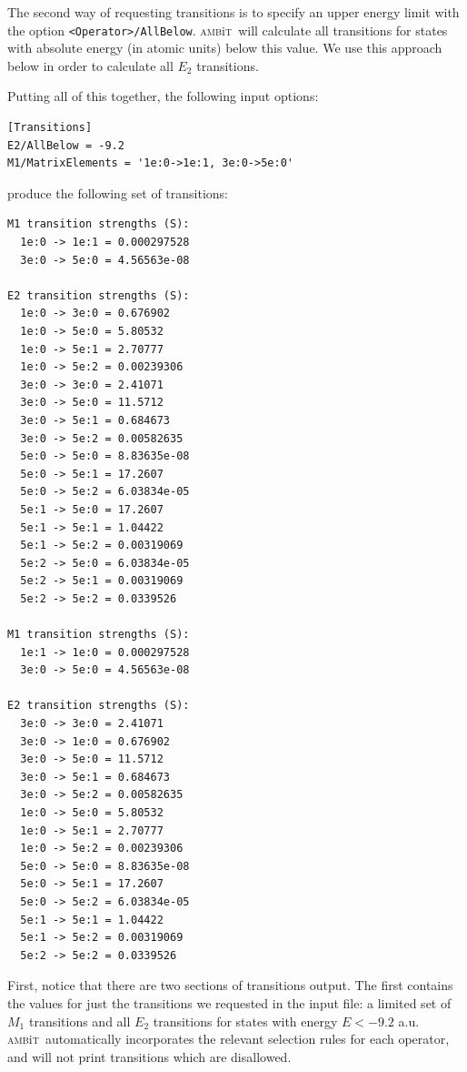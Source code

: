 \documentclass{report}
\newcommand{\ambit}{\textsc{amb}{\footnotesize i}\textsc{t}}
\begin{document}
The second way of requesting transitions is to specify an upper energy limit with the option
\texttt{<Operator>/AllBelow}. \ambit\  will calculate all transitions for states with absolute energy (in
atomic units) below this value. We use this approach below in order to calculate all $E_{2}$ 
transitions.

Putting all of this together, the following input options:

\begin{verbatim}
[Transitions]                                                                  
E2/AllBelow = -9.2                                                                
M1/MatrixElements = '1e:0->1e:1, 3e:0->5e:0'
\end{verbatim}

produce the following set of transitions:

\begin{verbatim}
M1 transition strengths (S):
  1e:0 -> 1e:1 = 0.000297528
  3e:0 -> 5e:0 = 4.56563e-08

E2 transition strengths (S):
  1e:0 -> 3e:0 = 0.676902
  1e:0 -> 5e:0 = 5.80532
  1e:0 -> 5e:1 = 2.70777
  1e:0 -> 5e:2 = 0.00239306
  3e:0 -> 3e:0 = 2.41071
  3e:0 -> 5e:0 = 11.5712
  3e:0 -> 5e:1 = 0.684673
  3e:0 -> 5e:2 = 0.00582635
  5e:0 -> 5e:0 = 8.83635e-08
  5e:0 -> 5e:1 = 17.2607
  5e:0 -> 5e:2 = 6.03834e-05
  5e:1 -> 5e:0 = 17.2607
  5e:1 -> 5e:1 = 1.04422
  5e:1 -> 5e:2 = 0.00319069
  5e:2 -> 5e:0 = 6.03834e-05
  5e:2 -> 5e:1 = 0.00319069
  5e:2 -> 5e:2 = 0.0339526

M1 transition strengths (S):
  1e:1 -> 1e:0 = 0.000297528
  3e:0 -> 5e:0 = 4.56563e-08

E2 transition strengths (S):
  3e:0 -> 3e:0 = 2.41071
  3e:0 -> 1e:0 = 0.676902
  3e:0 -> 5e:0 = 11.5712
  3e:0 -> 5e:1 = 0.684673
  3e:0 -> 5e:2 = 0.00582635
  1e:0 -> 5e:0 = 5.80532
  1e:0 -> 5e:1 = 2.70777
  1e:0 -> 5e:2 = 0.00239306
  5e:0 -> 5e:0 = 8.83635e-08
  5e:0 -> 5e:1 = 17.2607
  5e:0 -> 5e:2 = 6.03834e-05
  5e:1 -> 5e:1 = 1.04422
  5e:1 -> 5e:2 = 0.00319069
  5e:2 -> 5e:2 = 0.0339526
\end{verbatim}

First, notice that there are two sections of transitions output. The first contains the values for just
the transitions we requested in the input file: a limited set of $M_1$ transitions and all $E_2$
transitions for states with energy $E < -9.2$ a.u. \ambit\  automatically incorporates the relevant
selection rules for each operator, and will not print transitions which are disallowed. 
\end{document}
